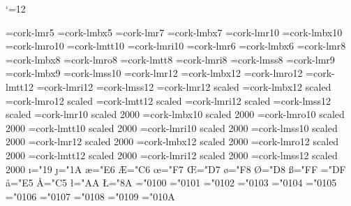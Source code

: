 \def\big#1{{\hbox{$\left#1\vbox to \bigsize{}\right.\n@space$}}}
\def\Big#1{{\hbox{$\left#1\vbox to \Bigsize{}\right.\n@space$}}}
\def\bigg#1{{\hbox{$\left#1\vbox to \biggsize{}\right.\n@space$}}}
\def\Bigg#1{{\hbox{$\left#1\vbox to \Biggsize{}\right.\n@space$}}}
\ifx\LMTone\@undefined%
{}
\else
\let\ifLMT=\relax
\fi
\ifx\LMTSone\@undefined%
{}
\else
\let\ifLMTS=\relax
\fi
\catcode`\@=12
\ifx\ifLMT\relax%
\immediate{}
\font\fiverm=cork-lmr5
\font\fivebf=cork-lmbx5
\font\sevenrm=cork-lmr7
\font\sevenbf=cork-lmbx7
\font\tenrm=cork-lmr10
\font\tenbf=cork-lmbx10
\font\tensl=cork-lmro10
\font\tentt=cork-lmtt10
\font\tenit=cork-lmri10
\font\sixrm=cork-lmr6
\font\sixbf=cork-lmbx6
\font\eightrm=cork-lmr8
\font\eightbf=cork-lmbx8
\font\eightsl=cork-lmro8
\font\eighttt=cork-lmtt8
\font\eightit=cork-lmri8
\font\eightss=cork-lmss8
\font\ninerm=cork-lmr9
\font\ninebf=cork-lmbx9
\font\tenss=cork-lmss10
\font\twelverm=cork-lmr12
\font\twelvebf=cork-lmbx12
\font\twelvesl=cork-lmro12
\font\twelvett=cork-lmtt12
\font\twelveit=cork-lmri12
\font\twelvess=cork-lmss12
\font\fourteenrm=cork-lmr12 scaled
\font\fourteenbf=cork-lmbx12 scaled
\font\fourteensl=cork-lmro12 scaled
\font\fourteentt=cork-lmtt12 scaled
\font\fourteenit=cork-lmri12 scaled
\font\fourteenss=cork-lmss12 scaled
\font\twentyrm=cork-lmr10 scaled 2000
\font\twentybf=cork-lmbx10 scaled 2000
\font\twentysl=cork-lmro10 scaled 2000
\font\twentytt=cork-lmtt10 scaled 2000
\font\twentyit=cork-lmri10 scaled 2000
\font\twentyss=cork-lmss10 scaled 2000
\font\twentyfourrm=cork-lmr12 scaled 2000
\font\twentyfourbf=cork-lmbx12 scaled 2000
\font\twentyfoursl=cork-lmro12 scaled 2000
\font\twentyfourtt=cork-lmtt12 scaled 2000
\font\twentyfourit=cork-lmri12 scaled 2000
\font\twentyfourss=cork-lmss12 scaled 2000
\chardef\i="19 \chardef\j="1A
\chardef\ae="E6 \chardef\AE="C6
\chardef\oe="F7 \chardef\OE="D7
\chardef\o="F8 \chardef\O="D8
\chardef\ss="FF \chardef\SS="DF
\chardef\aa="E5 \chardef\AA="C5
\chardef\l="AA \chardef\L="8A
\mathchardef\Gamma="0100
\mathchardef\Delta="0101
\mathchardef\Theta="0102
\mathchardef\Lambda="0103
\mathchardef\Xi="0104
\mathchardef\Pi="0105
\mathchardef\Sigma="0106
\mathchardef\Upsilon="0107
\mathchardef\Phi="0108
\mathchardef\Psi="0109
\mathchardef\Omega="010A

